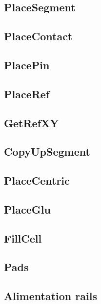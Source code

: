 \documentclass[11pt]{article}
\begin{document}
    \subsection{PlaceSegment}
    \label{secsegment}
    
    \subsection{PlaceContact}
    \label{seccontact}
    
    \subsection{PlacePin}
    \label{secpin}
        
    \subsection{PlaceRef}
    \label{secref}
    
    \subsection{GetRefXY}
    \label{secgetref}
    
    \subsection{CopyUpSegment}
    \label{seccopy}
        
    \subsection{PlaceCentric}
    \label{seccentric}
    
    \subsection{PlaceGlu}
    \label{secglu}
    
    \subsection{FillCell}
    \label{secfillcell}
    
    \subsection{Pads}
    \label{secpads}
    
    \subsection{Alimentation rails}
    \label{secrails}
    
\end{document}
